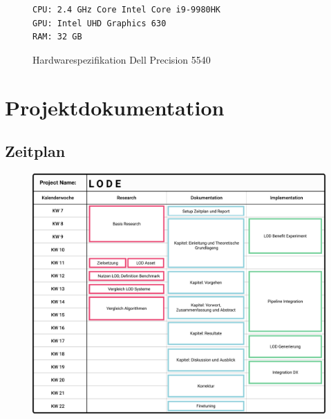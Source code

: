 \begin{figure}[H]
  \begin{lstlisting}
CPU: 2.4 GHz Core Intel Core i9-9980HK
GPU: Intel UHD Graphics 630
RAM: 32 GB
  \end{lstlisting}
\caption{Hardwarespezifikation Dell Precision 5540}
\label{fig:windowsSpecification}
\end{figure}

\section{Projektdokumentation}
\subsection{Zeitplan}
\begin{figure}[H]
  \centering
  \includegraphics[width=1\columnwidth]{../ressources/zeitplan.png}
\end{figure}
